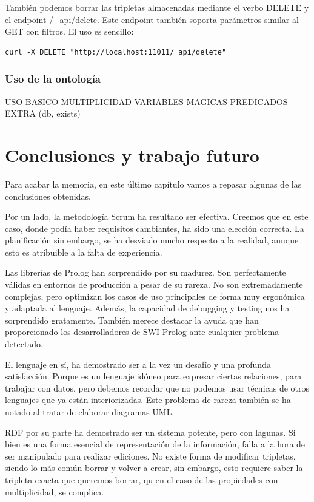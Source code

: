 \documentclass[12pt]{report} %
\begin{document}
También podemos borrar las tripletas almacenadas mediante el verbo DELETE y el endpoint /\_api/delete. Este endpoint también soporta parámetros similar al GET con filtros. El uso es sencillo:

\begin{verbatim}
curl -X DELETE "http://localhost:11011/_api/delete"
\end{verbatim}

\subsection{Uso de la ontología}

USO BASICO
MULTIPLICIDAD
VARIABLES MAGICAS
PREDICADOS EXTRA (db, exists)

\chapter{Conclusiones y trabajo futuro}

Para acabar la memoria, en este último capítulo vamos a repasar algunas de las conclusiones obtenidas.

Por un lado, la metodología Scrum ha resultado ser efectiva. Creemos que en este caso, donde podía haber requisitos cambiantes, ha sido una elección correcta. La planificación sin embargo, se ha desviado mucho respecto a la realidad, aunque esto es atribuible a la falta de experiencia.

Las librerías de Prolog han sorprendido por su madurez. Son perfectamente válidas en entornos de producción a pesar de su rareza. No son extremadamente complejas, pero optimizan los casos de uso principales de forma muy ergonómica y adaptada al lenguaje.  Además, la capacidad de debugging y testing nos ha sorprendido gratamente. También merece destacar la ayuda que han proporcionado los desarrolladores de SWI-Prolog ante cualquier problema detectado.

El lenguaje en sí, ha demostrado ser a la vez un desafío y una profunda satisfacción. Porque es un lenguaje idóneo para expresar ciertas relaciones, para trabajar con datos, pero debemos recordar que no podemos usar técnicas de otros lenguajes que ya están interiorizadas. Este problema de rareza también se ha notado al tratar de elaborar diagramas UML.

RDF por su parte ha demostrado ser un sistema potente, pero con lagunas. Si bien es una forma esencial de representación de la información, falla a la hora de ser manipulado para realizar ediciones. No existe forma de modificar tripletas, siendo lo más común borrar y volver a crear, sin embargo, esto requiere saber la tripleta exacta que queremos borrar, qu en el caso de las propiedades con multiplicidad, se complica.
\end{document}
